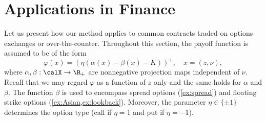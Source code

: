 \section{Applications in Finance}

Let us present how our method applies to common contracts traded on options exchanges or over-the-counter. %
Throughout this section,  the payoff function is assumed to be  of the form%
\begin{equation}\label{eq:payoff}
    \varphi(x) = \left( \eta  (\alpha(x) - \beta(x)-K)\right)^+, \quad x = (z,\nu), 
\end{equation}
where $\alpha, \beta: \calX \to \R_+$ 
are nonnegative projection maps independent of $\nu$. Recall that we may regard $\varphi$ as a function of $z$ only and the same holds for $\alpha$ and $\beta$.  %
The function $\beta$ is used to encompass spread options (\cref{ex:spread}) and  floating strike options (\cref{ex:Asian,ex:lookback}). Moreover, the parameter  $\eta \in \{\pm 1\}$ determines the option type (call  if $\eta=1$ and  put  if $\eta=-1$).


%
%


